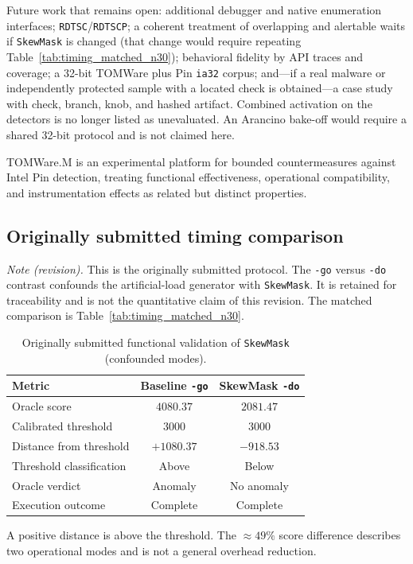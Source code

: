 \documentclass[pdflatex,sn-mathphys-num]{sn-jnl}
\theoremstyle{thmstyleone}
\theoremstyle{thmstyletwo}
\theoremstyle{thmstylethree}
\begin{document}
Future work that remains open: additional debugger and native enumeration interfaces; \texttt{RDTSC}/\texttt{RDTSCP}; a coherent treatment of overlapping and alertable waits if \texttt{SkewMask} is changed (that change would require repeating Table~\ref{tab:timing_matched_n30}); behavioral fidelity by API traces and coverage; a 32-bit TOMWare plus Pin \texttt{ia32} corpus; and---if a real malware or independently protected sample with a located check is obtained---a case study with check, branch, knob, and hashed artifact. Combined activation on the detectors is no longer listed as unevaluated. An Arancino bake-off would require a shared 32-bit protocol and is not claimed here.

TOMWare.M is an experimental platform for bounded countermeasures against Intel Pin detection, treating functional effectiveness, operational compatibility, and instrumentation effects as related but distinct properties.

\begin{appendices}
\section{Originally submitted timing comparison}
\label{app:timing_confounded}

\textit{Note (revision).} This is the originally submitted protocol. The \texttt{-go} versus \texttt{-do} contrast confounds the artificial-load generator with \texttt{SkewMask}. It is retained for traceability and is not the quantitative claim of this revision. The matched comparison is Table~\ref{tab:timing_matched_n30}.

\begin{table}[h]
\caption{Originally submitted functional validation of \texttt{SkewMask} (confounded modes).}
\label{tab:timing_old}
\centering
\small
\begin{tabular}{lcc}
\toprule
\textbf{Metric} & \textbf{Baseline \texttt{-go}} & \textbf{SkewMask \texttt{-do}} \\
\midrule
Oracle score & $4080.37$ & $2081.47$ \\
Calibrated threshold & $3000$ & $3000$ \\
Distance from threshold & $+1080.37$ & $-918.53$ \\
Threshold classification & Above & Below \\
Oracle verdict & Anomaly & No anomaly \\
Execution outcome & Complete & Complete \\
\bottomrule
\end{tabular}
\vspace{3pt}
\parbox{\columnwidth}{\footnotesize A positive distance is above the threshold. The $\approx 49\%$ score difference describes two operational modes and is not a general overhead reduction.}
\end{table}

\end{appendices}
\end{document}
